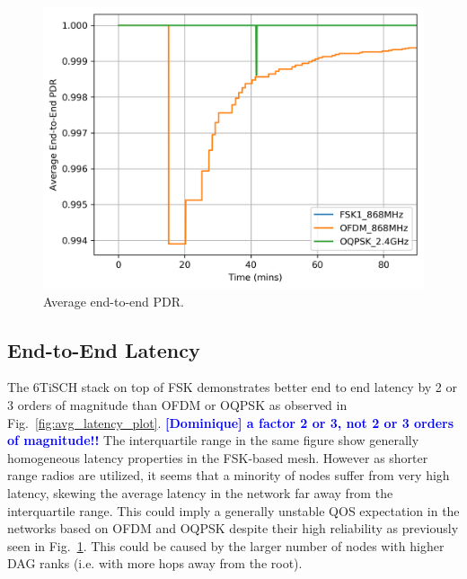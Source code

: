 \documentclass[journal]{IEEEtran}
\newcommand{\dominique}[1] {\textbf{\textcolor{blue}{[Dominique] #1}}}
\begin{document}
\begin{figure}
	\centering
	\includegraphics[width=0.9\columnwidth]{avg_pdr_plot.png}
	\caption{Average end-to-end PDR. }
    \label{fig:avg_pdr_plot}
\end{figure} 

\subsection{End-to-End Latency}
\label{sec:latency}

The 6TiSCH stack on top of FSK demonstrates better end to end latency by 2 or 3 orders of magnitude than OFDM or OQPSK as observed in Fig.~\ref{fig:avg_latency_plot}.
\dominique{a factor 2 or 3, not 2 or 3 orders of magnitude!!}
The interquartile range in the same figure show generally homogeneous latency properties in the FSK-based mesh. 
However as shorter range radios are utilized, it seems that a minority of nodes suffer from very high latency, skewing the average latency in the network far away from the interquartile range. 
This could imply a generally unstable QOS expectation in the networks based on OFDM and OQPSK despite their high reliability as previously seen in Fig.~\ref{fig:avg_pdr_plot}. 
This could be caused by the larger number of nodes with higher DAG ranks (i.e. with more hops away from the root).
\end{document}
